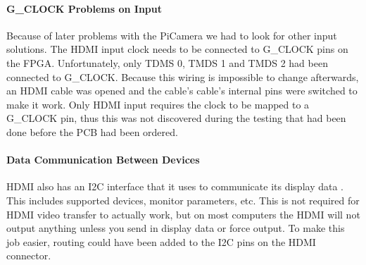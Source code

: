 \paragraph{G\_CLOCK Problems on Input}
Because of later problems with the PiCamera we had to look for other input solutions.
The HDMI input clock needs to be connected to G\_CLOCK pins on the FPGA.
Unfortunately, only TDMS 0, TMDS 1 and TMDS 2 had been connected to G\_CLOCK.
Because this wiring is impossible to change afterwards, an HDMI cable was opened and the cable's cable's internal pins were switched to make it work.
Only HDMI input requires the clock to be mapped to a G\_CLOCK pin,
thus this was not discovered during the testing that had been done before the PCB had been ordered.

\paragraph{Data Communication Between Devices}
HDMI also has an I2C interface that it uses to communicate its display data \cite{wikiddc}.
This includes supported devices, monitor parameters, etc.
This is not required for HDMI video transfer to actually work, but on most computers the HDMI will not output anything unless you send in display data or force output.
To make this job easier, routing could have been added to the I2C pins on the HDMI connector.


